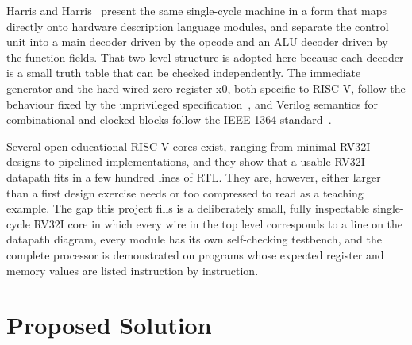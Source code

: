 \documentclass[conference]{IEEEtran}
\begin{document}
Harris and Harris~\cite{harris2021digital} present the same single-cycle
machine in a form that maps directly onto hardware description language
modules, and separate the control unit into a main decoder driven by the
opcode and an ALU decoder driven by the function fields. That two-level
structure is adopted here because each decoder is a small truth table that can
be checked independently. The immediate generator and the hard-wired zero
register x0, both specific to RISC-V, follow the behaviour fixed by the
unprivileged specification~\cite{riscv_unpriv_2026}, and Verilog semantics for
combinational and clocked blocks follow the IEEE 1364
standard~\cite{ieee1364verilog}.

Several open educational RISC-V cores exist, ranging from minimal RV32I
designs to pipelined implementations, and they show that a usable RV32I
datapath fits in a few hundred lines of RTL. They are, however, either larger
than a first design exercise needs or too compressed to read as a teaching
example. The gap this project fills is a deliberately small, fully inspectable
single-cycle RV32I core in which every wire in the top level corresponds to a
line on the datapath diagram, every module has its own self-checking
testbench, and the complete processor is demonstrated on programs whose
expected register and memory values are listed instruction by instruction.

\section{Proposed Solution}
\end{document}
